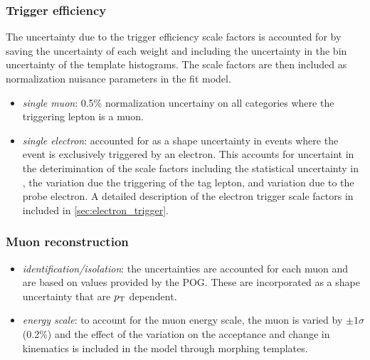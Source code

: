 \subsubsection{Trigger efficiency}

The uncertainty due to the trigger efficiency scale factors is
accounted for by saving the uncertainty of each weight and including the
uncertainty in the bin uncertainty of the template histograms.  The scale
factors are then included as normalization nuisance parameters in the
fit model.

\begin{itemize}
    \item \textit{single muon}: 0.5\% normalization uncertainy on all
        categories where the triggering lepton is a muon.
    \item \textit{single electron}: accounted for as a shape uncertainty
        in events where the event is exclusively triggered by an
        electron.  This accounts for uncertaint in the deterimination of
        the scale factors including the statistical uncertainty in , the
        variation due the triggering of the tag lepton, and variation
        due to the probe electron.  A detailed description of the
        electron trigger scale factors in included in
        \ref{sec:electron_trigger}.
\end{itemize}

\subsubsection{Muon reconstruction}
    \begin{itemize}
    \item \textit{identification/isolation}: the uncertainties are
        accounted for each muon and are based on values provided
        by the POG.  These are incorporated as a shape uncertainty that
        are $p_{\mathrm{T}}$ dependent.  
    \item \textit{energy scale}: to account for the muon energy scale,
        the muon \pt is varied by $\pm 1 \sigma$ (0.2\%) and the effect of
        the variation on the acceptance and change in kinematics is included
        in the model through morphing templates.
    \end{itemize}


